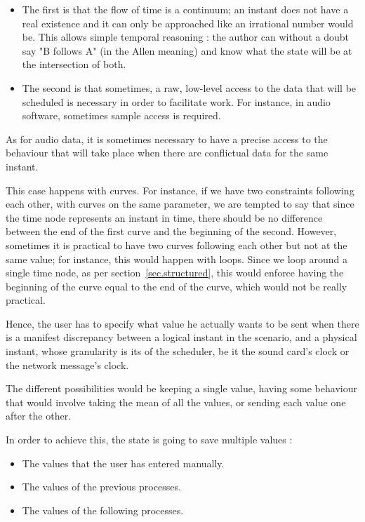 \documentclass{sigchi}
\begin{document}
\begin{itemize}
	\item The first is that the flow of time is a continuum; an instant does not have a real existence and it can only be approached like an irrational number would be.
	This allows simple temporal reasoning : the author can without a doubt say "B follows A" (in the Allen meaning) and know what the state will be at the intersection of both.
	\item The second is that sometimes, a raw, low-level access to the data that will be scheduled is necessary in order to facilitate work. For instance, in audio software, sometimes sample access is required.   
\end{itemize}
As for audio data, it is sometimes necessary to have a precise access to the behaviour that will take place when there are conflictual data for the same instant. %

This case happens with curves. For instance, if we have two constraints following each other, with curves on the same parameter, we are tempted to say that since the time node represents an instant in time, there should be no difference between the end of the first curve and the beginning of the second. However, sometimes it is practical to have two curves following each other but not at the same value; for instance, this would happen with loops. Since we loop around a single time node, as per section~\ref{sec.structured}, this would enforce having the beginning of the curve equal to the end of the curve, which would not be really practical.

Hence, the user has to specify what value he actually wants to be sent when there is a manifest discrepancy between a logical instant in the scenario, and a physical instant, whose granularity is its of the scheduler, be it the sound card's clock or the network message's clock.

The different possibilities would be keeping a single value, having some behaviour that would involve taking the mean of all the values, or sending each value one after the other.

In order to achieve this, the state is going to save multiple values : 
\begin{itemize}
	\item The values that the user has entered manually.
	\item The values of the previous processes.
	\item The values of the following processes.
\end{itemize}
\end{document}
